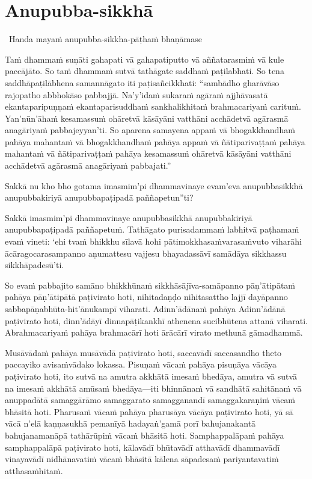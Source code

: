 \suttaRef{[SN 56.11]}


\section{Anupubba-sikkhā}

\begin{leader}
  \anglebracketleft\ \hspace{-0.5mm}Handa mayaṁ anupubba-sikkha-pāṭhaṁ bhaṇāmase \hspace{-0.5mm}\anglebracketright\
\end{leader}

Taṁ dhammaṁ suṇāti gahapati vā gahapatiputto vā aññatarasmiṁ vā kule paccājāto. So taṁ dhammaṁ sutvā tathāgate saddhaṁ paṭilabhati. So tena saddhāpaṭilābhena samannāgato iti paṭisañcikkhati: ``sambādho gharāvāso rajopatho abbhokāso pabbajjā. Na'y'idaṁ sukaraṁ agāraṁ ajjhāvasatā ekantaparipuṇṇaṁ ekantaparisuddhaṁ sankhalikhitaṁ brahmacariyaṁ carituṁ. Yan'nūn'āhaṁ kesamassuṁ ohāretvā kāsāyāni vatthāni acchādetvā agārasmā anagāriyaṁ pabbajeyyan'ti. So aparena samayena appaṁ vā bhogakkhandhaṁ pahāya mahantaṁ vā bhogakkhandhaṁ pahāya appaṁ vā ñātiparivaṭṭaṁ pahāya mahantaṁ vā ñātiparivaṭṭaṁ pahāya kesamassuṁ ohāretvā kāsāyāni vatthāni acchādetvā agārasmā anagāriyaṁ pabbajati.''

\suttaRef{[MN 27 / 38 / 51]}

Sakkā nu kho bho gotama imasmim'pi dhammavinaye evam'eva anupubbasikkhā anupubbakiriyā anupubbapaṭipadā paññapetun''ti?

Sakkā imasmim'pi dhammavinaye anupubbasikkhā anupubbakiriyā anupubbapaṭipadā paññapetuṁ. Tathāgato purisadammaṁ labhitvā paṭhamaṁ evaṁ vineti: `ehi tvaṁ bhikkhu sīlavā hohi pātimokkhasaṁvarasaṁvuto viharāhi ācāragocarasampanno aṇumattesu vajjesu bhayadassāvī samādāya sikkhassu sikkhāpadesū'ti.

\suttaRef{[MN 107]}

So evaṁ pabbajito samāno bhikkhūnaṁ sikkhāsājīva-samāpanno pāṇ'ātipātaṁ pahāya pāṇ'ātipātā paṭivirato hoti, nihitadaṇḍo nihitasattho lajjī dayāpanno sabbapāṇabhūta-hit'ānukampī viharati. Adinn'ādānaṁ pahāya Adinn'ādānā paṭivirato hoti, dinn'ādāyī dinnapāṭikankhī athenena sucibhūtena attanā viharati. Abrahmacariyaṁ pahāya brahmacārī hoti ārācārī virato methunā gāmadhammā.

Musāvādaṁ pahāya musāvādā paṭivirato hoti, saccavādī saccasandho theto paccayiko avisaṁvādako lokassa. Pisuṇaṁ vācaṁ pahāya pisuṇāya vācāya paṭivirato hoti, ito sutvā na amutra akkhātā imesaṁ bhedāya, amutra vā sutvā na imesaṁ akkhātā amūsaṁ bhedāya—iti bhinnānaṁ vā sandhātā sahitānaṁ vā anuppadātā samaggārāmo samaggarato samagganandī samaggakaraṇiṁ vācaṁ bhāsitā hoti. Pharusaṁ vācaṁ pahāya pharusāya vācāya paṭivirato hoti, yā sā vācā n'elā kaṇṇasukhā pemanīyā hadayaṅ'gamā porī bahujanakantā bahujanamanāpā tathārūpiṁ vācaṁ bhāsitā hoti. Samphappalāpaṁ pahāya samphappalāpā paṭivirato hoti, kālavādī bhūtavādī atthavādī dhammavādī vinayavādī nidhānavatiṁ vācaṁ bhāsitā kālena sāpadesaṁ pariyantavatiṁ atthasaṁhitaṁ.

